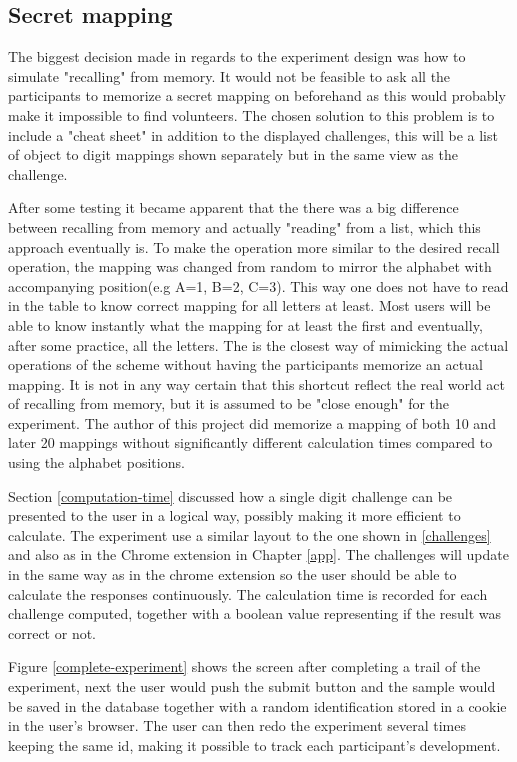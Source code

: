 \subsection{Secret mapping} The biggest decision made in regards to the experiment design was how to simulate "recalling" from memory. It would not be feasible to ask all the participants to memorize a secret mapping on beforehand as this would probably make it impossible to find volunteers. The chosen solution to this problem is to include a "cheat sheet" in addition to the displayed challenges, this will be a list of object to digit mappings shown separately but in the same view as the challenge.
\par After some testing it became apparent that the there was a big difference between recalling from memory and actually "reading" from a list, which this approach eventually is. To make the operation more similar to the desired recall operation, the mapping was changed from random to mirror the alphabet with accompanying position(e.g A=1, B=2, C=3). This way one does not have to read in the table to know correct mapping for all letters at least. Most users will be able to know instantly what the mapping for at least the first and eventually, after some practice, all the letters. The is the closest way of mimicking the actual operations of the scheme without having the participants memorize an actual mapping. It is not in any way certain that this shortcut reflect the real world act of recalling from memory, but it is assumed to be "close enough" for the experiment. The author of this project did memorize a mapping of both 10 and later 20 mappings without significantly different calculation times compared to using the alphabet positions.

\par Section \ref{computation-time} discussed how a single digit challenge can be presented to the user in a logical way, possibly making it more efficient to calculate. The experiment use a similar layout to the one shown in \autoref{challenges} and also as in the Chrome extension in Chapter \ref{app}. The challenges will update in the same way as in the chrome extension so the user should be able to calculate the responses continuously. The calculation time is recorded for each challenge computed, together with a boolean value representing if the result was correct or not. 
\par Figure \ref{complete-experiment} shows the screen after completing a trail of the experiment, next the user would push the submit button and the sample would be saved in the database together with a random identification stored in a cookie in the user's browser. The user can then redo the experiment several times keeping the same id, making it possible to track each participant's development.

